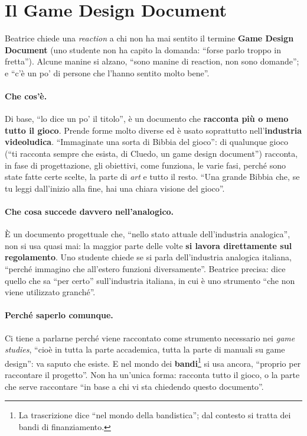 \section{Il Game Design Document}
\label{a9:sec:gdd}

Beatrice chiede una \emph{reaction} a chi non ha mai sentito il termine \textbf{Game
Design Document} (uno studente non ha capito la domanda: ``forse parlo troppo in
fretta''). Alcune manine si alzano, ``sono manine di reaction, non sono domande''; e
``c'è un po' di persone che l'hanno sentito molto bene''.

\paragraph{Che cos'è.} Di base, ``lo dice un po' il titolo'', è un documento che
\textbf{racconta più o meno tutto il gioco}. Prende forme molto diverse ed è usato
soprattutto nell'\textbf{industria videoludica}. ``Immaginate una sorta di Bibbia del
gioco'': di qualunque gioco (``ti racconta sempre che esista, di Cluedo, un game design
document'') racconta, in fase di progettazione, gli obiettivi, come funziona, le varie
fasi, perché sono state fatte certe scelte, la parte di \emph{art} e tutto il resto.
``Una grande Bibbia che, se tu leggi dall'inizio alla fine, hai una chiara visione del
gioco''.

\paragraph{Che cosa succede davvero nell'analogico.} È un documento progettuale che,
``nello stato attuale dell'industria analogica'', non si usa quasi mai: la maggior
parte delle volte \textbf{si lavora direttamente sul regolamento}. Uno studente chiede
se si parla dell'industria analogica italiana, ``perché immagino che all'estero
funzioni diversamente''. Beatrice precisa: dice quello che sa ``per certo''
sull'industria italiana, in cui è uno strumento ``che non viene utilizzato granché''.

\paragraph{Perché saperlo comunque.} Ci tiene a parlarne perché viene raccontato come
strumento necessario nei \emph{game studies}, ``cioè in tutta la parte accademica,
tutta la parte di manuali su game design'': va saputo che esiste. E nel mondo dei
\textbf{bandi}\footnote{La trascrizione dice ``nel mondo della bandistica''; dal
contesto si tratta dei bandi di finanziamento.} si usa ancora, ``proprio per
raccontare il progetto''. Non ha un'unica forma: racconta tutto il gioco, o la parte
che serve raccontare ``in base a chi vi sta chiedendo questo documento''.

